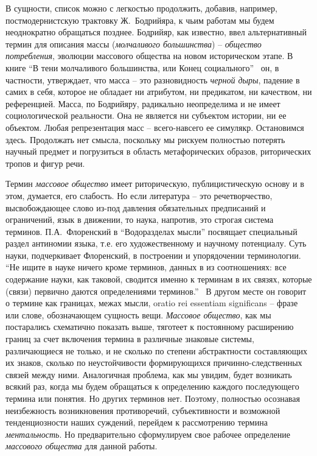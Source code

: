 В сущности, список можно с легкостью продолжить, добавив, например, постмодернистскую
трактовку Ж.~Бодрийяра, к чьим работам мы будем неоднократно обращаться позднее.
Бодрийяр, как известно, ввел альтернативный термин для описания массы (\emph{молчаливого большинства}) --
\emph{общество потребления}, эволюции массового общества на новом историческом этапе.
В книге ``В тени молчаливого большинства, или Конец социального''~\autocite{book:bodriyar} он, в частности,
утверждает, что масса -- это разновидность \emph{черной дыры}, падение в самих в
себя, которое не обладает ни атрибутом, ни предикатом, ни качеством, ни референцией.
Масса, по Бодрийяру, радикально неопределима и не имеет социологической реальности.
Она не является ни субъектом истории, ни ее объектом. Любая репрезентация масс -- всего-навсего
ее симулякр. Остановимся здесь. Продолжать нет смысла, поскольку мы рискуем полностью
потерять научный предмет и погрузиться в область метафорических образов, риторических
тропов и фигур речи.

Термин \emph{массовое общество} имеет риторическую, публицистическую основу и в этом,
думается, его слабость. Но если литература -- это речетворчество, высвобождающее слово
из-под давления обязательных предписаний и ограничений, язык в движении, то наука,
напротив, это строгая система терминов. П.А.~Флоренский в ``Водоразделах мысли''\autocite{book:florensky1} посвящает
специальный раздел антиномии языка, т.е. его художественному и научному потенциалу.
Суть науки, подчеркивает Флоренский, в построении и упорядочении терминологии.
``Не ищите в науке ничего кроме терминов, данных в из соотношениях:
все содержание науки, как таковой, сводится именно к терминам в их связях,
которые (связи) первично даются определениями терминов.''~\autocite{book:florensky2}
В другом месте он говорит о термине как границах, межах мысли, oratio rei essentiam significans
-- фразе или слове, обозначающем сущность вещи.
\emph{Массовое общество}, как мы постарались схематично показать выше, тяготеет к
постоянному расширению границ за счет включения термина в различные знаковые системы,
различающиеся не только, и не сколько по степени абстрактности составляющих их знаков,
сколько по неустойчивости формирующихся причинно-следственных связей между ними.
Аналогичная проблема, как мы увидим, будет возникать всякий раз, когда мы будем
обращаться к определению каждого последующего термина или понятия. Но других терминов нет.
Поэтому, полностью осознавая неизбежность возникновения противоречий, субъективности
и возможной тенденциозности наших суждений, перейдем к рассмотрению термина \emph{ментальность}.
Но предварительно сформулируем свое рабочее определение \emph{массового общества}
для данной работы.

